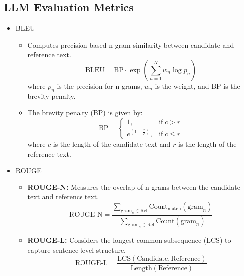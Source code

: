 \documentclass[12pt,a4paper]{article}
\begin{document}
\subsection{LLM Evaluation Metrics}
\begin{itemize}
\item BLEU
\begin{itemize}
    \item Computes precision-based n-gram similarity between candidate and reference text.
    \[
    \text{BLEU} = \text{BP} \cdot \exp \left( \sum_{n=1}^{N} w_n \log p_n \right)
    \]
    where \( p_n \) is the precision for n-grams, \( w_n \) is the weight, and BP is the brevity penalty.
    \item The brevity penalty (BP) is given by:
    \[
    \text{BP} =
    \begin{cases}
        1, & \text{if } c > r \\
        e^{(1 - \frac{r}{c})}, & \text{if } c \leq r
    \end{cases}
    \]
    where \( c \) is the length of the candidate text and \( r \) is the length of the reference text.

\end{itemize}
\item ROUGE
\begin{itemize}
    \item \textbf{ROUGE-N:} Measures the overlap of n-grams between the candidate text and reference text.
    \[
    \text{ROUGE-N} = \frac{\sum_{\text{gram}_n \in \text{Ref}} \text{Count}_{\text{match}}(\text{gram}_n)}{\sum_{\text{gram}_n \in \text{Ref}} \text{Count}(\text{gram}_n)}
    \]
    \item \textbf{ROUGE-L:} Considers the longest common subsequence (LCS) to capture sentence-level structure.
    \[
    \text{ROUGE-L} = \frac{\text{LCS}(\text{Candidate}, \text{Reference})}{\text{Length}(\text{Reference})}
    \]
\end{itemize}

\end{itemize}
\end{document}
